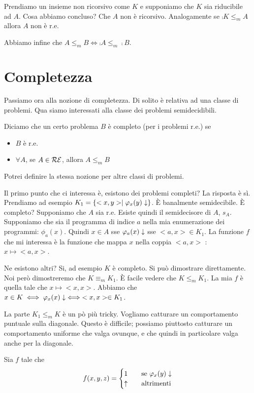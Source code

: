 Prendiamo un insieme non ricorsivo come $K$ e supponiamo che $K$ sia riducibile ad $A$. Cosa abbiamo
concluso? Che $A$ non è ricorsivo. Analogamente se $\comp{K} \leq_{m} A$ allora $A$ non è r.e.

Abbiamo infine che $A \leq_{m} B \iff \comp{A} \leq_{m} \comp{B}$.

\section{Completezza}

Passiamo ora alla nozione di completezza. Di solito è relativa ad una classe di problemi. Qua siamo
interessati alla classe dei problemi semidecidibili.
\begin{defn}
    Diciamo che un certo problema $B$ è completo (per i problemi r.e.) se
    \begin{itemize}
        \item $B$ è r.e.
        \item $\forall A$, se $A \in \mathcal{RE}$, allora $A \leq_{m} B$
    \end{itemize}
\end{defn}

Potrei definire la stessa nozione per altre classi di problemi.

Il primo punto che ci interessa è, esistono dei problemi completi? La risposta è sì. Prendiamo ad
esempio $K_{1} = \left\{<x,y> \mid \varphi_{x}(y) \downarrow\right\}$. È banalmente semidecibile. È completo? Supponiamo
che $A$ sia r.e. Esiste quindi il semidecisore di $A$, $s_{A}$. Supponiamo che sia il programma di
indice $a$ nella mia enumerazione dei programmi: $\phi_{a}(x)$. Quindi $x \in A$ sse $\varphi_{a}(x) \downarrow$
sse $<a,x> \in K_{1}$. La funzione $f$ che mi interessa è la funzione che mappa $x$ nella coppia
$<a,x>$ : $x \mapsto <a,x>$.

Ne esistono altri? Si, ad esempio $K$ è completo. Si può dimostrare direttamente. Noi però
dimostreremo che $K \equiv_{m} K_{1}$. È facile vedere che $K \leq_{m} K_{1}$. La mia $f$ è quella tale
che $x \mapsto <x,x>$. Abbiamo che $x \in K \iff \varphi_{x}(x)\downarrow \iff <x,x> \in K_{1}$.

La parte $K_{1} \leq_{m} K$ è un pò più tricky. Vogliamo catturare un comportamento puntuale sulla
diagonale. Questo è difficile; possiamo piuttosto catturare un comportamento uniforme che valga
ovunque, e che quindi in particolare valga anche per la diagonale.

Sia $f$ tale che
\begin{equation*}
    f(x,y,z) =
    \begin{cases}
        1 \quad &\text{se $\varphi_{x}(y) \downarrow$} \\
        \uparrow \quad &\text{altrimenti}
    \end{cases}
\end{equation*}

